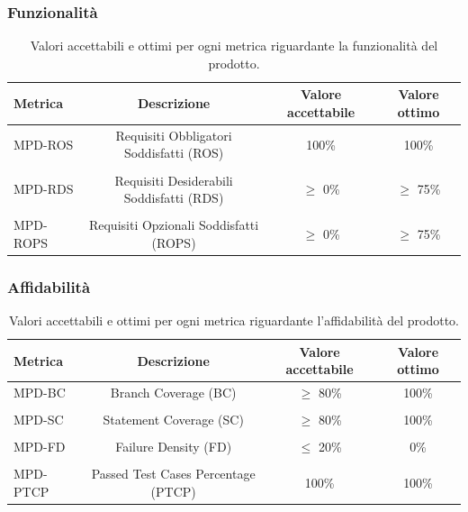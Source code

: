 \documentclass[8pt]{article}
\begin{document}
\subsubsection{Funzionalità}
\begin{table}[H]	
	\centering
	\begin{tabular}{lccc}
		\toprule
		\textbf{Metrica}& \textbf{Descrizione} & \textbf{Valore accettabile} & \textbf{Valore ottimo} \\
		\midrule
		MPD-ROS& Requisiti Obbligatori Soddisfatti (ROS) & 100\% & 100\%\\\\
		MPD-RDS & Requisiti Desiderabili Soddisfatti (RDS) & $\geq$ 0\% & $\geq$ 75\% \\\\
		MPD-ROPS & Requisiti Opzionali Soddisfatti (ROPS) & $\geq$ 0\% & $\geq$ 75\% \\
		\bottomrule
	\end{tabular}
	\caption{Valori accettabili e ottimi per ogni metrica riguardante la funzionalità del prodotto.}
	\label{table:Valori accettabili e ottimi per ogni metrica riguardante la funzionalità del prodotto.}
\end{table}
\subsubsection{Affidabilità}
\begin{table}[H]	
	\centering
	\begin{tabular}{lccc}
		\toprule
		\textbf{Metrica}& \textbf{Descrizione} & \textbf{Valore accettabile} & \textbf{Valore ottimo} \\
		\midrule
		MPD-BC & Branch Coverage (BC) & $\geq$ 80\% & 100\%\\\\
		MPD-SC & Statement Coverage (SC) & $\geq$ 80\% & 100\% \\\\
		MPD-FD & Failure Density (FD) & $\leq$ 20\% & 0\% \\\\
		MPD-PTCP & Passed Test Cases Percentage (PTCP) & 100\%  & 100\% \\
		\bottomrule
	\end{tabular}
	\caption{Valori accettabili e ottimi per ogni metrica riguardante l’affidabilità del prodotto.}
	\label{table:Valori accettabili e ottimi per ogni metrica riguardante l’affidabilità del prodotto.}
\end{table}
\end{document}
